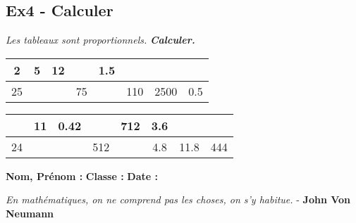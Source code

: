 \documentclass[12pt]{article}
\begin{document}
\subsection*{Ex4 - Calculer}

\textit{Les tableaux sont proportionnels.} \textit{\textbf{Calculer.}}

\begin{center}
  \begin{tabular}{|c|c|c|c|c|c|c|c|}
    \hline
    2  &               5 &              12 & \phantom{$\dfrac{\dfrac{123456789}{1}}{1}$} &             1.5 & \phantom{$\dfrac{\dfrac{123456789}{1}}{1}$} & \phantom{$\dfrac{\dfrac{123456789}{1}}{1}$} & \phantom{$\dfrac{\dfrac{123456789}{1}}{1}$}  \\  \hline
    25 & \phantom{$\dfrac{\dfrac{123456789}{1}}{1}$} & \phantom{$\dfrac{\dfrac{123456789}{1}}{1}$} &              75 & \phantom{$\dfrac{\dfrac{123456789}{1}}{1}$} &             110 &            2500 &              0.5 \\  \hline
  \end{tabular}
\end{center} 

\begin{center}
  \begin{tabular}{|c|c|c|c|c|c|c|c|}
    \hline
    \phantom{$\dfrac{\dfrac{123456789}{1}}{1}$} &               11 &            0.42 & \phantom{$\dfrac{\dfrac{123456789}{1}}{1}$} &             712 & 3.6 & \phantom{$\dfrac{\dfrac{123456789}{1}}{1}$} & \phantom{$\dfrac{\dfrac{123456789}{1}}{1}$} \\  \hline
    24              &  \phantom{$\dfrac{\dfrac{123456789}{1}}{1}$} & \phantom{$\dfrac{\dfrac{123456789}{1}}{1}$} &             512 & \phantom{$\dfrac{\dfrac{123456789}{1}}{1}$} & 4.8 &            11.8 &             444 \\  \hline
  \end{tabular}
\end{center} 


\newpage


\textbf{Nom, Prénom :} \hspace{8cm} \textbf{Classe :} \hspace{3cm} \textbf{Date :}\\

\begin{center}
  \textit{En mathématiques, on ne comprend pas les choses, on s'y habitue.}  - \textbf{John Von Neumann}
\end{center}
\end{document}
